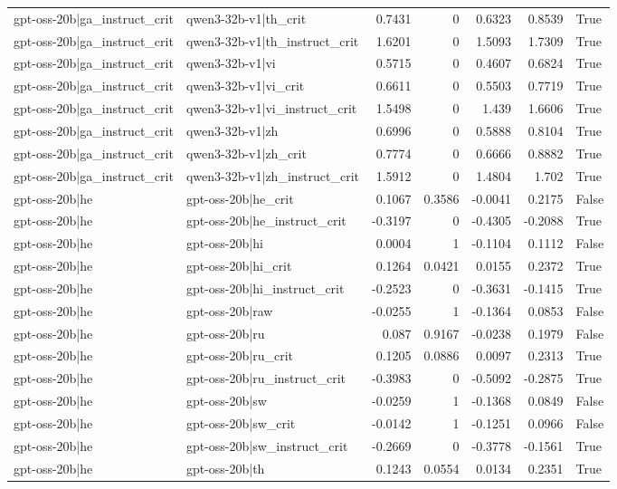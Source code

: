 \begin{table}
\begin{tabular}{l l r r r r l}
gpt-oss-20b|ga_instruct_crit & qwen3-32b-v1|th_crit & 0.7431 & 0 & 0.6323 & 0.8539 & True \\
gpt-oss-20b|ga_instruct_crit & qwen3-32b-v1|th_instruct_crit & 1.6201 & 0 & 1.5093 & 1.7309 & True \\
gpt-oss-20b|ga_instruct_crit & qwen3-32b-v1|vi & 0.5715 & 0 & 0.4607 & 0.6824 & True \\
gpt-oss-20b|ga_instruct_crit & qwen3-32b-v1|vi_crit & 0.6611 & 0 & 0.5503 & 0.7719 & True \\
gpt-oss-20b|ga_instruct_crit & qwen3-32b-v1|vi_instruct_crit & 1.5498 & 0 & 1.439 & 1.6606 & True \\
gpt-oss-20b|ga_instruct_crit & qwen3-32b-v1|zh & 0.6996 & 0 & 0.5888 & 0.8104 & True \\
gpt-oss-20b|ga_instruct_crit & qwen3-32b-v1|zh_crit & 0.7774 & 0 & 0.6666 & 0.8882 & True \\
gpt-oss-20b|ga_instruct_crit & qwen3-32b-v1|zh_instruct_crit & 1.5912 & 0 & 1.4804 & 1.702 & True \\
gpt-oss-20b|he & gpt-oss-20b|he_crit & 0.1067 & 0.3586 & -0.0041 & 0.2175 & False \\
gpt-oss-20b|he & gpt-oss-20b|he_instruct_crit & -0.3197 & 0 & -0.4305 & -0.2088 & True \\
gpt-oss-20b|he & gpt-oss-20b|hi & 0.0004 & 1 & -0.1104 & 0.1112 & False \\
gpt-oss-20b|he & gpt-oss-20b|hi_crit & 0.1264 & 0.0421 & 0.0155 & 0.2372 & True \\
gpt-oss-20b|he & gpt-oss-20b|hi_instruct_crit & -0.2523 & 0 & -0.3631 & -0.1415 & True \\
gpt-oss-20b|he & gpt-oss-20b|raw & -0.0255 & 1 & -0.1364 & 0.0853 & False \\
gpt-oss-20b|he & gpt-oss-20b|ru & 0.087 & 0.9167 & -0.0238 & 0.1979 & False \\
gpt-oss-20b|he & gpt-oss-20b|ru_crit & 0.1205 & 0.0886 & 0.0097 & 0.2313 & True \\
gpt-oss-20b|he & gpt-oss-20b|ru_instruct_crit & -0.3983 & 0 & -0.5092 & -0.2875 & True \\
gpt-oss-20b|he & gpt-oss-20b|sw & -0.0259 & 1 & -0.1368 & 0.0849 & False \\
gpt-oss-20b|he & gpt-oss-20b|sw_crit & -0.0142 & 1 & -0.1251 & 0.0966 & False \\
gpt-oss-20b|he & gpt-oss-20b|sw_instruct_crit & -0.2669 & 0 & -0.3778 & -0.1561 & True \\
gpt-oss-20b|he & gpt-oss-20b|th & 0.1243 & 0.0554 & 0.0134 & 0.2351 & True \\

\end{tabular}
\end{table}
